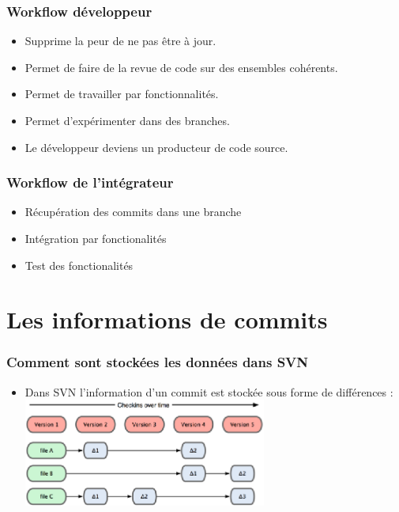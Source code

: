 \documentclass{beamer}
\begin{document}
    \begin{frame}
      \frametitle{Workflow développeur}
      \begin{itemize}
        \item Supprime la peur de ne pas être à jour.
        \item Permet de faire de la revue de code sur des ensembles cohérents.
        \item Permet de travailler par fonctionnalités.
        \item Permet d'expérimenter dans des branches.
        \item Le développeur deviens un producteur de code source.
      \end{itemize}
    \end{frame}

    \begin{frame}
      \frametitle{Workflow de l'intégrateur}
      \begin{itemize}
        \item Récupération des commits dans une branche
        \item Intégration par fonctionalités
        \item Test des fonctionalités
      \end{itemize}
    \end{frame}
    \section{Les informations de commits}

    \begin{frame}
      \frametitle{Comment sont stockées les données dans SVN}
      \begin{itemize}
        \item Dans SVN l'information d'un commit est stockée sous forme de différences :
         \includegraphics[width=8cm]{imgs/deltas.eps}
      \end{itemize}
    \end{frame}
\end{document}
